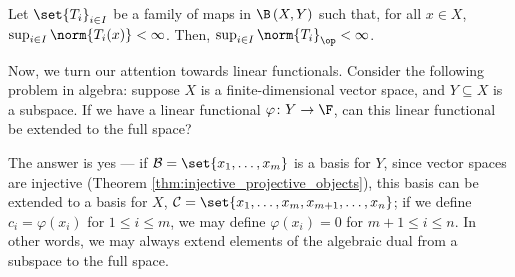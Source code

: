 \begin{theorem}\label{thm:uniform_boundedness}
  Let $\set{T_i}_{i\in I}$ be a family of maps in $\B\left(X,Y\right)$ such that, for all $x\in X$, $\sup_{i\in I}\norm{T_i(x)} < \infty$. Then, $\sup_{i\in I}\norm{T_i}_{\op} < \infty$.
\end{theorem}
Now, we turn our attention towards linear functionals. Consider the following problem in algebra: suppose $X$ is a finite-dimensional vector space, and $Y\subseteq X$ is a subspace. If we have a linear functional $\varphi\colon Y\rightarrow \F$, can this linear functional be extended to the full space?\newline

The answer is yes --- if $\mathcal{B} = \set{x_1,\dots,x_m}$ is a basis for $Y$, since vector spaces are injective (Theorem \ref{thm:injective_projective_objects}), this basis can be extended to a basis for $X$, $\mathcal{C} = \set{x_1,\dots,x_m,x_{m+1},\dots,x_n}$; if we define $c_i = \varphi\left(x_i\right)$ for $1 \leq i \leq m$, we may define $\varphi\left(x_i\right) = 0$ for $m+1 \leq i \leq n$. In other words, we may always extend elements of the algebraic dual from a subspace to the full space.\newline

